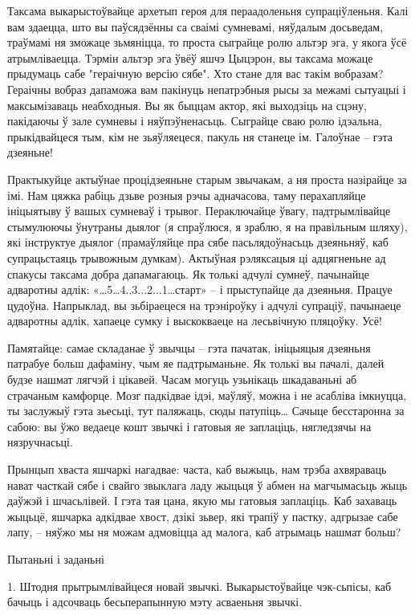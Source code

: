 Таксама выкарыстоўвайце архетып героя для пераадоленьня супраціўленьня. Калі вам здаецца, што вы паўсядзённы са сваімі сумневамі, няўдалым досьведам, траўмамі ня зможаце зьмяніцца, то проста сыграйце ролю альтэр эга, у якога ўсё атрымліваецца. Тэрмін альтэр эга ўвёў яшчэ Цыцэрон, вы таксама можаце прыдумаць сабе "гераічную версію сябе". Хто стане для вас такім вобразам? Гераічны вобраз дапаможа вам пакінуць непатрэбныя рысы за межамі сытуацыі і максымізаваць неабходныя. Вы як быццам актор, які выходзіць на сцэну, пакідаючы ў зале сумневы і няўпэўненасьць. Сыграйце сваю ролю ідэальна, прыкідвайцеся тым, кім не зьяўляецеся, пакуль ня станеце ім. Галоўнае – гэта дзеяньне!

Практыкуйце актыўнае процідзеяньне старым звычакам, а ня проста назірайце за імі. Нам цяжка рабіць дзьве розныя рэчы адначасова, таму перахапляйце ініцыятыву ў вашых сумневаў і трывог. Пераключайце ўвагу, падтрымлівайце стымулюючы ўнутраны дыялог (я спраўлюся, я зраблю, я на правільным шляху), які інструктуе дыялог (прамаўляйце пра сябе пасьлядоўнасьць дзеяньняў, каб супрацьстаяць трывожным думкам). Актыўная рэляксацыя ці адцягненьне ад спакусы таксама добра дапамагаюць. Як толькі адчулі сумнеў, пачынайце адваротны адлік: «…5…4..3...2...1…старт» – і прыступайце да дзеяньня. Працуе цудоўна. Напрыклад, вы зьбіраецеся на трэніроўку і адчулі супраціў, пачынаеце адваротны адлік, хапаеце сумку і выскокваеце на лесьвічную пляцоўку. Усё!

Памятайце: самае складанае ў звычцы – гэта пачатак, ініцыяцыя дзеяньня патрабуе больш дафаміну, чым яе падтрыманьне. Як толькі вы пачалі, далей будзе нашмат лягчэй і цікавей. Часам могуць узьнікаць шкадаваньні аб страчаным камфорце. Мозг падкідвае ідэі, маўляў, можна і не асабліва імкнуцца, ты заслужыў гэта зьесьці, тут паляжаць, сюды патупіць… Сачыце бесстаронна за сабою: вы ўжо ведаеце кошт звычкі і гатовыя яе заплаціць, нягледзячы на нязручнасьці.

Прынцып хваста яшчаркі нагадвае: часта, каб выжыць, нам трэба ахвяраваць нават часткай сябе і свайго звыклага ладу жыцьця ў абмен на магчымасьць жыць даўжэй і шчасьлівей. І гэта тая цана, якую мы гатовыя заплаціць. Каб захаваць жыцьцё, яшчарка адкідвае хвост, дзікі зьвер, які трапіў у пастку, адгрызае сабе лапу, – няўжо мы ня можам адмовіцца ад малога, каб атрымаць нашмат больш?

Пытаньні і заданьні

1. Штодня прытрымлівайцеся новай звычкі. Выкарыстоўвайце чэк-сьпісы, каб бачыць і адсочваць бесьперапынную мэту асваеньня звычкі.

